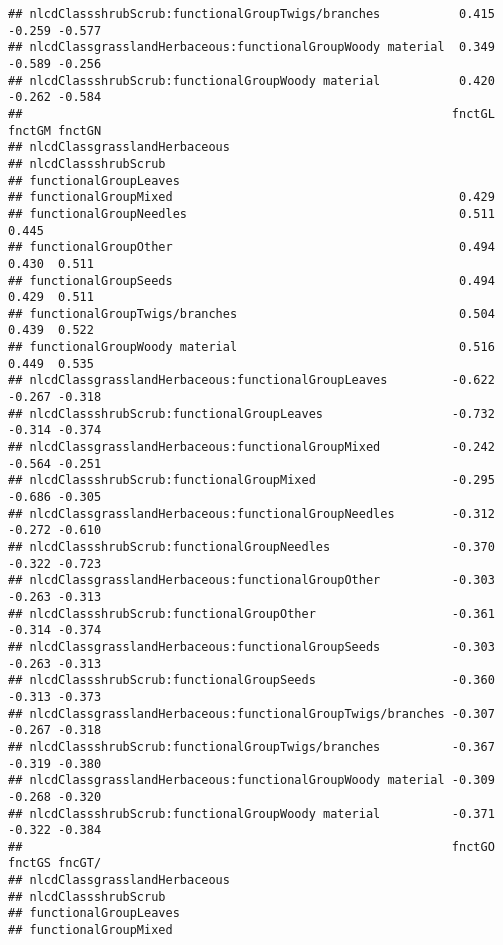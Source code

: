 \documentclass[]{article}
\begin{document}
\begin{verbatim}
## nlcdClassshrubScrub:functionalGroupTwigs/branches           0.415 -0.259 -0.577
## nlcdClassgrasslandHerbaceous:functionalGroupWoody material  0.349 -0.589 -0.256
## nlcdClassshrubScrub:functionalGroupWoody material           0.420 -0.262 -0.584
##                                                            fnctGL fnctGM fnctGN
## nlcdClassgrasslandHerbaceous                                                   
## nlcdClassshrubScrub                                                            
## functionalGroupLeaves                                                          
## functionalGroupMixed                                        0.429              
## functionalGroupNeedles                                      0.511  0.445       
## functionalGroupOther                                        0.494  0.430  0.511
## functionalGroupSeeds                                        0.494  0.429  0.511
## functionalGroupTwigs/branches                               0.504  0.439  0.522
## functionalGroupWoody material                               0.516  0.449  0.535
## nlcdClassgrasslandHerbaceous:functionalGroupLeaves         -0.622 -0.267 -0.318
## nlcdClassshrubScrub:functionalGroupLeaves                  -0.732 -0.314 -0.374
## nlcdClassgrasslandHerbaceous:functionalGroupMixed          -0.242 -0.564 -0.251
## nlcdClassshrubScrub:functionalGroupMixed                   -0.295 -0.686 -0.305
## nlcdClassgrasslandHerbaceous:functionalGroupNeedles        -0.312 -0.272 -0.610
## nlcdClassshrubScrub:functionalGroupNeedles                 -0.370 -0.322 -0.723
## nlcdClassgrasslandHerbaceous:functionalGroupOther          -0.303 -0.263 -0.313
## nlcdClassshrubScrub:functionalGroupOther                   -0.361 -0.314 -0.374
## nlcdClassgrasslandHerbaceous:functionalGroupSeeds          -0.303 -0.263 -0.313
## nlcdClassshrubScrub:functionalGroupSeeds                   -0.360 -0.313 -0.373
## nlcdClassgrasslandHerbaceous:functionalGroupTwigs/branches -0.307 -0.267 -0.318
## nlcdClassshrubScrub:functionalGroupTwigs/branches          -0.367 -0.319 -0.380
## nlcdClassgrasslandHerbaceous:functionalGroupWoody material -0.309 -0.268 -0.320
## nlcdClassshrubScrub:functionalGroupWoody material          -0.371 -0.322 -0.384
##                                                            fnctGO fnctGS fncGT/
## nlcdClassgrasslandHerbaceous                                                   
## nlcdClassshrubScrub                                                            
## functionalGroupLeaves                                                          
## functionalGroupMixed                                                           

\end{verbatim}
\end{document}
